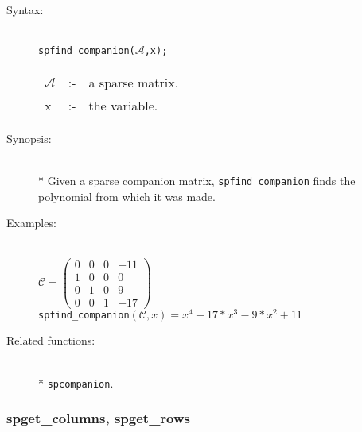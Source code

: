 \begin{description}
\item[Syntax:]\mbox{}\\
 \texttt{spfind\_companion($\mathcal{A}$,x);}\\[2mm]
\begin{tabular}{l l l}
$\mathcal{A}$ &:-& a sparse matrix. \\
x          &:-& the variable.
\end{tabular}

\item[Synopsis:]\mbox{}\\*
  Given a sparse companion matrix, \texttt{spfind\_companion} finds the polynomial
from which it was made.

\item[Examples:]\mbox{}\\
\(\mathcal{C} = \begin{pmatrix} 0 & 0 & 0 & -11 \\ 1 & 0 & 0 & 0
\\ 0 & 1 & 0 & 9 \\ 0 & 0 & 1 & -17
\end{pmatrix}\) \\[2mm]
\texttt{spfind\_companion}\((\mathcal{C},x) = x^4+17*x^3-9*x^2+11\)

\item[Related functions:]\mbox{}\\*
 \texttt{spcompanion}.
\end{description}

\subsubsection{spget\_columns, spget\_rows}
\label{sparse:spget_columns}
\hypertarget{operator:SPGET_COLUMNS}{}

